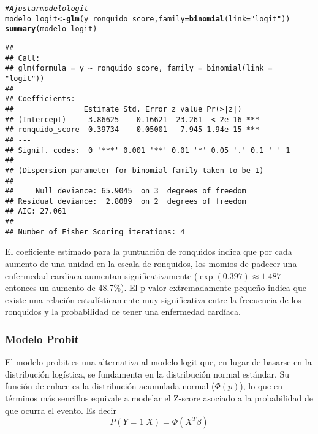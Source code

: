 \documentclass[paper=letter, fontsize=11pt, draft=false]{scrartcl}\usepackage[]{graphicx}\usepackage[]{xcolor}
\makeatletter
\newcommand{\hlsng}[1]{\textcolor[rgb]{0.192,0.494,0.8}{#1}}%
\newcommand{\hlcom}[1]{\textcolor[rgb]{0.678,0.584,0.686}{\textit{#1}}}%
\newcommand{\hlopt}[1]{\textcolor[rgb]{0,0,0}{#1}}%
\newcommand{\hldef}[1]{\textcolor[rgb]{0.345,0.345,0.345}{#1}}%
\newcommand{\hlkwb}[1]{\textcolor[rgb]{0.69,0.353,0.396}{#1}}%
\newcommand{\hlkwc}[1]{\textcolor[rgb]{0.333,0.667,0.333}{#1}}%
\newcommand{\hlkwd}[1]{\textcolor[rgb]{0.737,0.353,0.396}{\textbf{#1}}}%
\newenvironment{kframe}{%
 \def\at@end@of@kframe{}%
 \ifinner\ifhmode%
  \def\at@end@of@kframe{\end{minipage}}%
  \begin{minipage}{\columnwidth}%
 \fi\fi%
 \def\FrameCommand##1{\hskip\@totalleftmargin \hskip-\fboxsep
 \colorbox{shadecolor}{##1}\hskip-\fboxsep
     \hskip-\linewidth \hskip-\@totalleftmargin \hskip\columnwidth}%
 \MakeFramed {\advance\hsize-\width
   \@totalleftmargin\z@ \linewidth\hsize
   \@setminipage}}%
 {\par\unskip\endMakeFramed%
 \at@end@of@kframe}
\newenvironment{knitrout}{}{} %
\numberwithin{equation}{problemcounter} %
\numberwithin{figure}{problemcounter} %
\numberwithin{table}{problemcounter} %
\numberwithin{subsection}{problemcounter}
\makeatother
\begin{document}
\begin{knitrout}
\color{fgcolor}\begin{kframe}
\begin{alltt}
\hlcom{# Ajustar modelo logit}
\hldef{modelo_logit} \hlkwb{<-} \hlkwd{glm}\hldef{(y} \hlopt{~} \hldef{ronquido_score,} \hlkwc{family} \hldef{=} \hlkwd{binomial}\hldef{(}\hlkwc{link} \hldef{=} \hlsng{"logit"}\hldef{))}
\hlkwd{summary}\hldef{(modelo_logit)}
\end{alltt}
\begin{verbatim}
## 
## Call:
## glm(formula = y ~ ronquido_score, family = binomial(link = "logit"))
## 
## Coefficients:
##                Estimate Std. Error z value Pr(>|z|)    
## (Intercept)    -3.86625    0.16621 -23.261  < 2e-16 ***
## ronquido_score  0.39734    0.05001   7.945 1.94e-15 ***
## ---
## Signif. codes:  0 '***' 0.001 '**' 0.01 '*' 0.05 '.' 0.1 ' ' 1
## 
## (Dispersion parameter for binomial family taken to be 1)
## 
##     Null deviance: 65.9045  on 3  degrees of freedom
## Residual deviance:  2.8089  on 2  degrees of freedom
## AIC: 27.061
## 
## Number of Fisher Scoring iterations: 4
\end{verbatim}
\end{kframe}
\end{knitrout}

El coeficiente estimado para la puntuación de ronquidos indica que por cada aumento de una unidad en la escala de ronquidos, los momios de padecer una enfermedad cardiaca aumentan significativamente ($\exp(0.397) \approx 1.487$ entonces un aumento de 48.7\%). El p-valor extremadamente pequeño indica que existe una relación estadísticamente muy significativa entre la frecuencia de los ronquidos y la probabilidad de tener una enfermedad cardíaca.

\subsubsection*{Modelo Probit}

El modelo probit es una alternativa al modelo logit que, en lugar de basarse en la distribución logística, se fundamenta en la distribución normal estándar. Su función de enlace es la distribución acumulada normal ($\Phi(p)$), lo que en términos más sencillos equivale a modelar el Z-score asociado a la probabilidad de que ocurra el evento. Es decir
$$P(Y=1|X) = \Phi(X^T\beta)$$
\end{document}
